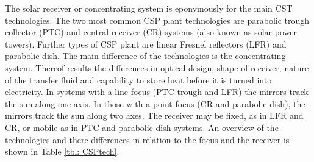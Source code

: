 The solar receiver or concentrating system is eponymously for the main CST technologies. The two most common CSP plant technologies are parabolic trough collector (PTC) and central receiver (CR) systems (also known as solar power towers). Further types of CSP plant are linear Fresnel reflectors (LFR) and parabolic dish. The main difference of the technologies is the concentrating system. Thereof results the differences in optical design, shape of receiver, nature of the transfer fluid and capability to store heat before it is turned into electricity. In systems with a line focus (PTC trough and LFR) the mirrors track the sun along one axis. In those with a point focus (CR and parabolic dish), the mirrors track the sun along two axes. The receiver may be fixed, as in LFR and CR, or mobile as in PTC and parabolic dish systems. An overview of the technologies and there differences in relation to the focus and the receiver  is shown in Table \ref{tbl: CSPtech}.
